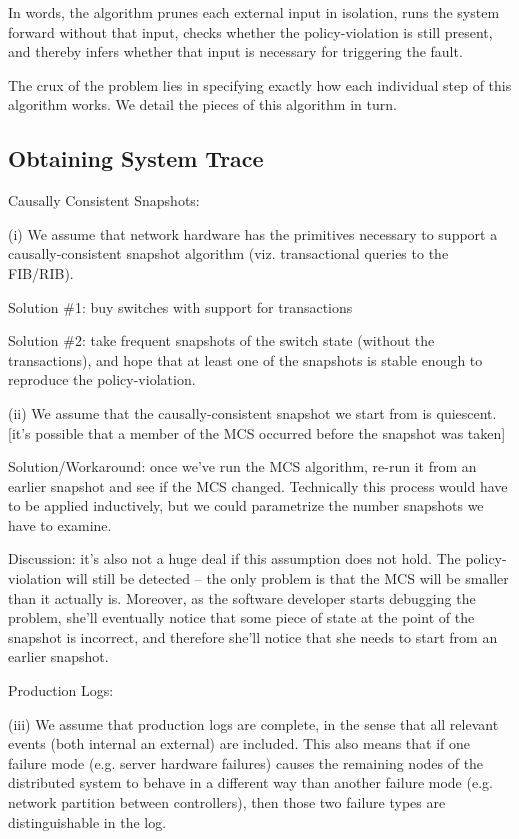 \noindent In words, the algorithm prunes each external input in isolation,
runs the system forward without that input, checks whether the
policy-violation is still present, and thereby infers whether that input is
necessary for triggering the fault.

The crux of the problem lies in specifying exactly how each
individual step of this algorithm works. We detail the pieces of this algorithm in
turn.

\subsection{Obtaining System Trace}

Causally Consistent Snapshots:                                                                                  

(i) We assume that network hardware has the primitives necessary to support a causally-consistent snapshot algorithm (viz. transactional queries to the FIB/RIB).                                                                     

Solution \#1: buy switches with support for transactions

Solution \#2:  take frequent snapshots of the switch state (without the transactions), and hope that at least one of the snapshots is stable enough to reproduce the policy-violation.

(ii) We assume that the causally-consistent snapshot we start from is quiescent. [it's possible that a member of the MCS occurred before the snapshot was taken]

Solution/Workaround: once we've run the MCS algorithm, re-run it from an earlier snapshot and see if the MCS changed. Technically this process would have to be applied inductively, but we could parametrize the number snapshots we have to examine.

Discussion: it's also not a huge deal if this assumption does not hold. The policy-violation will still be detected -- the only problem is that the MCS will be smaller than it actually is. Moreover, as the software developer starts debugging the problem, she'll eventually notice that some piece of state at the point of the snapshot is incorrect, and therefore she'll notice that she needs to start from an earlier snapshot.
                                                                                           
Production Logs:

(iii) We assume that production logs are complete, in the sense that all relevant events (both internal an external) are included. This also means that if one failure mode (e.g. server hardware failures) causes the remaining nodes of the distributed system to behave in a different way than another failure mode (e.g. network partition between controllers), then those two failure types are distinguishable in the log. 

